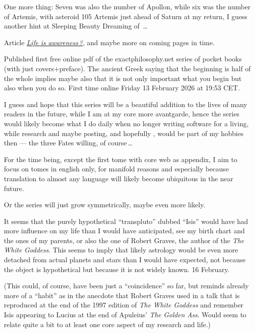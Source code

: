 \begin{itemize}
One more thing:
Seven was also the number of Apollon,
while six was the number of Artemis,
with asteroid 105 Artemis just ahead of Saturn at my return,
I guess another hint at Sleeping Beauty Dreaming of \ELEMENTAL\,…

Article \href{https://www.exactphilosophy.net/life-is-awareness.pdf}{\color{xphi}\textsl{Life is awareness\,?}},
and maybe more on coming pages in time.

Published first free online pdf
of the {\color{gray}exactphilosophy.net series}
of pocket books (with just covers+preface).
%
The ancient Greek saying that the beginning is half of the whole
implies maybe also that it is not only important what you begin
but also when you do so.
%
First time online Friday 13 February 2026 at 19:53 CET.

I guess and hope that this series will be a beautiful addition
to the lives of many readers in the future,
while I am at my core more avantgarde,
hence the series would likely become
what I do daily when no longer writing software for a living,
while research and maybe posting,
and hopefully \ELEMENTAL,
would be part of my hobbies then%
\hspace{0.05em}—\hspace{0.05em}%
the three Fates willing, of course\,…

For the time being,
except the first tome with core web as appendix,
I aim to focus on tomes in english only,
for manifold reasons
and especially because translation to almost any language
will likely become ubiquitous in the near future.

Or the series will just grow symmetrically,
maybe even more likely.

It seems that the purely hypothetical “transpluto” dubbed “Isis”
would have had more influence on my life
than I would have anticipated,
see my birth chart and the ones of my parents,
or also the one of Robert Graves,
the author of the \textsl{The White Goddess}.
%
This seems to imply
that likely astrology would be even more detached
from actual planets and stars
than I would have expected,
not because the object is hypothetical
but because it is not widely known.
%
16 February.

(This could, of course,
have been just a “coincidence” so far,
but reminds already more of a “habit”
as in the anecdote that Robert Graves used in a talk
that is reproduced at the end of the 1997 edition of \hspace{-0.05em}\textsl{The White Goddess}
and remember Isis appearing to Lucius at the end of Apuleius’ \hspace{-0.1em}\textsl{The Golden Ass}.
%
Would seem to relate quite a bit
to at least one core aspect of my research and life.)


\end{itemize}
